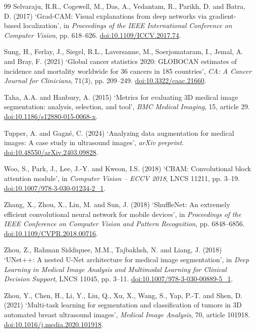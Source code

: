 \documentclass[12pt,a4paper,oneside]{report}
\begin{document}
\begin{thebibliography}{99}
Selvaraju, R.R., Cogswell, M., Das, A., Vedantam, R., Parikh, D. and Batra, D. (2017)
`Grad-CAM: Visual explanations from deep networks via gradient-based localization',
in \textit{Proceedings of the IEEE International Conference on Computer Vision}, pp. 618--626.
\href{https://doi.org/10.1109/ICCV.2017.74}{doi:10.1109/ICCV.2017.74}.

Sung, H., Ferlay, J., Siegel, R.L., Laversanne, M., Soerjomataram, I., Jemal, A. and Bray, F. (2021)
`Global cancer statistics 2020: GLOBOCAN estimates of incidence and mortality worldwide for 36 cancers in 185 countries',
\textit{CA: A Cancer Journal for Clinicians}, 71(3), pp. 209--249.
\href{https://doi.org/10.3322/caac.21660}{doi:10.3322/caac.21660}.

Taha, A.A. and Hanbury, A. (2015)
`Metrics for evaluating 3D medical image segmentation: analysis, selection, and tool',
\textit{BMC Medical Imaging}, 15, article 29.
\href{https://doi.org/10.1186/s12880-015-0068-x}{doi:10.1186/s12880-015-0068-x}.

Tupper, A. and Gagné, C. (2024)
`Analyzing data augmentation for medical images: A case study in ultrasound images',
\textit{arXiv preprint}.
\href{https://doi.org/10.48550/arXiv.2403.09828}{doi:10.48550/arXiv.2403.09828}.

Woo, S., Park, J., Lee, J.-Y. and Kweon, I.S. (2018)
`CBAM: Convolutional block attention module',
in \textit{Computer Vision -- ECCV 2018}, LNCS 11211, pp. 3--19.
\href{https://doi.org/10.1007/978-3-030-01234-2_1}{doi:10.1007/978-3-030-01234-2\_1}.

Zhang, X., Zhou, X., Lin, M. and Sun, J. (2018)
`ShuffleNet: An extremely efficient convolutional neural network for mobile devices',
in \textit{Proceedings of the IEEE Conference on Computer Vision and Pattern Recognition}, pp. 6848--6856.
\href{https://doi.org/10.1109/CVPR.2018.00716}{doi:10.1109/CVPR.2018.00716}.

Zhou, Z., Rahman Siddiquee, M.M., Tajbakhsh, N. and Liang, J. (2018)
`UNet++: A nested U-Net architecture for medical image segmentation',
in \textit{Deep Learning in Medical Image Analysis and Multimodal Learning for Clinical Decision Support}, LNCS 11045, pp. 3--11.
\href{https://doi.org/10.1007/978-3-030-00889-5_1}{doi:10.1007/978-3-030-00889-5\_1}.

Zhou, Y., Chen, H., Li, Y., Liu, Q., Xu, X., Wang, S., Yap, P.-T. and Shen, D. (2021)
`Multi-task learning for segmentation and classification of tumors in 3D automated breast ultrasound images',
\textit{Medical Image Analysis}, 70, article 101918.
\href{https://doi.org/10.1016/j.media.2020.101918}{doi:10.1016/j.media.2020.101918}.

\end{thebibliography}
\end{document}
